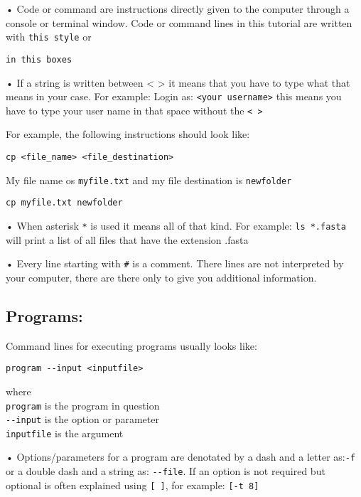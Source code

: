 \documentclass[
]{book}
\begin{document}
• Code or command are instructions directly given to the computer through a console or terminal window. Code or command lines in this tutorial are written with \texttt{this\ style} or

\begin{verbatim}
in this boxes
\end{verbatim}

• If a string is written between \textless{} \textgreater{} it means that you have to type what that means in your case. For example: Login as: \texttt{\textless{}your\ username\textgreater{}} this means you have to type your user name in that space without the \texttt{\textless{}\ \textgreater{}}

For example, the following instructions should look like:

\begin{verbatim}
cp <file_name> <file_destination>
\end{verbatim}

My file name os \texttt{myfile.txt} and my file destination is \texttt{newfolder}

\begin{verbatim}
cp myfile.txt newfolder
\end{verbatim}

• When asterisk \texttt{*} is used it means all of that kind. For example: \texttt{ls\ *.fasta} will print a list of all files that have the extension .fasta

• Every line starting with \texttt{\#} is a comment. There lines are not interpreted by your computer, there are there only to give you additional information.

\hypertarget{programs}{%
\subsection{Programs:}\label{programs}}

Command lines for executing programs usually looks like:

\begin{verbatim}
program --input <inputfile>
\end{verbatim}

where\\
\texttt{program} is the program in question\\
\texttt{-\/-input} is the option or parameter\\
\texttt{inputfile} is the argument

• Options/parameters for a program are denotated by a dash and a letter as:\texttt{-f} or a double dash and a string as: \texttt{-\/-file}. If an option is not required but optional is often explained using \texttt{{[}\ {]}}, for example: \texttt{{[}-t\ 8{]}}
\end{document}
